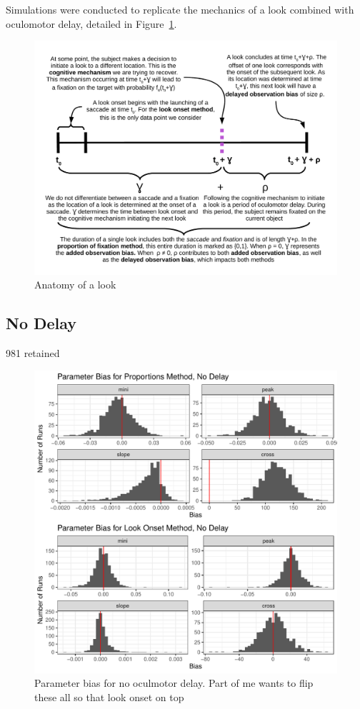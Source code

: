 \documentclass{article}
\begin{document}
Simulations were conducted to replicate the mechanics of a look combined with oculomotor delay, detailed in Figure~\ref{fig:anatomy_of_look}.


\begin{figure}[H]
\centering
\includegraphics[width=\textwidth]{anatomy_of_look.pdf}
\caption{Anatomy of a look}
\label{fig:anatomy_of_look}
\end{figure}


\subsection{No Delay}

981 retained

\begin{figure}[H]
\centering
\includegraphics{no_delay_par_bias.pdf}
\caption{Parameter bias for no oculmotor delay. Part of me wants to flip these all so that look onset on top}
\label{fig:par_bias_no_delay}
\end{figure}
\end{document}
